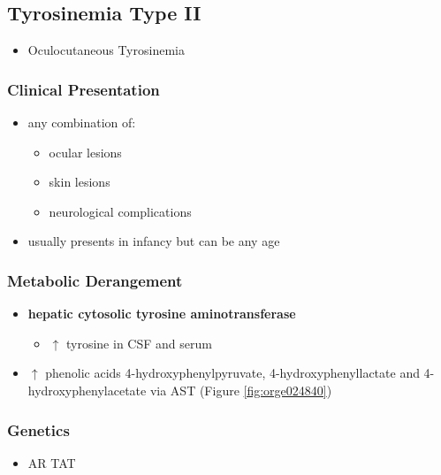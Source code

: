 \documentclass[12pt]{scrartcl}
\begin{document}
\subsection{Tyrosinemia Type II}
\label{sec:org2499f38}
\begin{itemize}
\item Oculocutaneous Tyrosinemia
\end{itemize}
\subsubsection{Clinical Presentation}
\label{sec:org9f6062b}
\begin{itemize}
\item any combination of: 
\begin{itemize}
\item ocular lesions
\item skin lesions
\item neurological complications
\end{itemize}
\item usually presents in infancy but can be any age
\end{itemize}

\subsubsection{Metabolic Derangement}
\label{sec:org0fde68e}
\begin{itemize}
\item \textbf{hepatic cytosolic tyrosine aminotransferase}


\begin{itemize}
\item \(\uparrow\) tyrosine in CSF and serum
\end{itemize}
\item \(\uparrow\) phenolic acids 4-hydroxyphenylpyruvate,
4-hydroxyphenyllactate and 4-hydroxyphenylacetate via AST (Figure \ref{fig:orge024840})
\end{itemize}

\subsubsection{Genetics}
\label{sec:orgc4e4210}
\begin{itemize}
\item AR TAT
\end{itemize}
\end{document}
